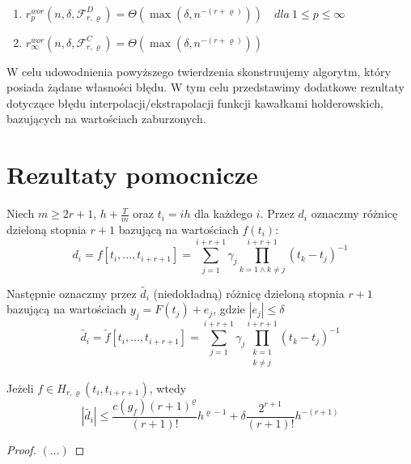 \documentclass[oik, pdftex, robocza, man]{mgrwms}
\begin{document}
\begin{thm}
\label{AoP_tw1}~ %
    \begin{enumerate}
        \item $r^{wor}_{p}(n, \delta, \mathcal{F}^{D}_{r,\varrho}) = \Theta(\max(\delta, n^{-(r+\varrho)})) \quad dla \: 1 \leq p \leq \infty$
        \item $r^{wor}_{\infty}(n, \delta, \mathcal{F}^{C}_{r,\varrho}) = \Theta(\max(\delta, n^{-(r+\varrho)}))$
    \end{enumerate}
\end{thm}

W celu udowodnienia powyższego twierdzenia skonstruujemy algorytm, który posiada żądane własności błędu. W tym celu przedstawimy dodatkowe rezultaty dotyczące błędu interpolacji/ekstrapolacji funkcji kawałkami holderowskich, bazujących na wartościach zaburzonych.

\section{Rezultaty pomocnicze}

Niech $m \geq 2r + 1$, $h + \frac{T}{m}$ oraz $t_{i} = ih$ dla każdego $i$. Przez $d_{i}$ oznaczmy różnicę dzieloną stopnia $r+1$ bazującą na wartościach $f(t_{i})$:
\begin{equation*}
    d_{i} = f[t_{i}, \dots, t_{i+r+1}] = \sum_{j = 1}^{i+r+1} \gamma_{j} \prod_{k=1 \land k \neq j}^{i+r+1}(t_{k}-t_{j})^{-1}
\end{equation*}

Następnie oznaczmy przez $\tilde{d_i}$ (niedokładną) różnicę dzieloną stopnia $r+1$ bazującą na wartościach $y_{j} = F(t_{j}) + e_{j}$, gdzie $|e_{j}| \leq \delta$
\begin{equation*}
    \tilde{d_{i}} = \tilde{f}[t_{i}, \dots, t_{i+r+1}] = \sum_{j = 1}^{i+r+1} \gamma_{j} \prod_{\substack{k=1 \\ k \neq j}}^{i+r+1}(t_{k}-t_{j})^{-1}
\end{equation*}

\begin{lemma}
    Jeżeli $f \in H_{r, \varrho}(t_{i}, t_{i+r+1})$, wtedy
    \begin{equation*}
        |\tilde{d_{i}}| \leq \frac{c(g_{f})(r+1)^{\varrho}}{(r+1)!} h^{\varrho-1} + \delta \frac{2^{r+1}}{(r+1)!} h^{-(r+1)}
    \end{equation*}
\end{lemma}
\begin{proof}
    $(\dots)$
\end{proof}
\end{document}
